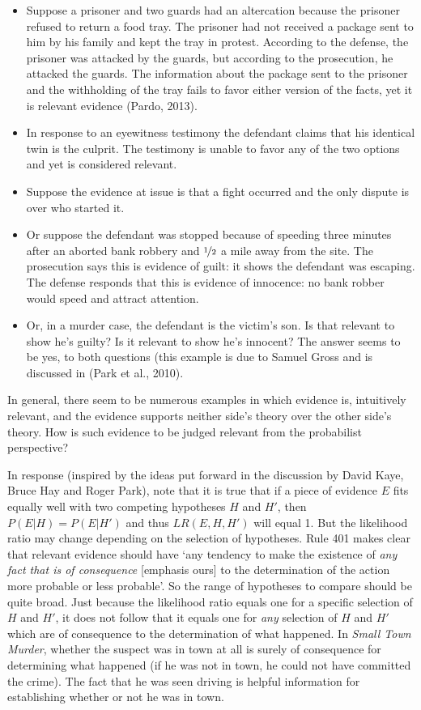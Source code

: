 \documentclass[10pt,dvipsnames,enabledeprecatedfontcommands]{scrartcl}
\begin{document}
\begin{itemize}
\item
  Suppose a prisoner and two guards had an altercation because the
  prisoner refused to return a food tray. The prisoner had not received
  a package sent to him by his family and kept the tray in protest.
  According to the defense, the prisoner was attacked by the guards, but
  according to the prosecution, he attacked the guards. The information
  about the package sent to the prisoner and the withholding of the tray
  fails to favor either version of the facts, yet it is relevant
  evidence (Pardo, 2013).
\item
  In response to an eyewitness testimony the defendant claims that his
  identical twin is the culprit. The testimony is unable to favor any of
  the two options and yet is considered relevant.
\item
  Suppose the evidence at issue is that a fight occurred and the only
  dispute is over who started it.
\item
  Or suppose the defendant was stopped because of speeding three minutes
  after an aborted bank robbery and \(\nicefrac{1}{2}\) a mile away from
  the site. The prosecution says this is evidence of guilt: it shows the
  defendant was escaping. The defense responds that this is evidence of
  innocence: no bank robber would speed and attract attention.
\item
  Or, in a murder case, the defendant is the victim's son. Is that
  relevant to show he's guilty? Is it relevant to show he's innocent?
  The answer seems to be yes, to both questions (this example is due to
  Samuel Gross and is discussed in (Park et al., 2010).
\end{itemize}

In general, there seem to be numerous examples in which evidence is,
intuitively relevant, and the evidence supports neither side's theory
over the other side's theory. How is such evidence to be judged relevant
from the probabilist perspective?

In response (inspired by the ideas put forward in the discussion by
David Kaye, Bruce Hay and Roger Park), note that it is true that if a
piece of evidence \(E\) fits equally well with two competing hypotheses
\(H\) and \(H'\), then \(P(E\vert H)=P(E\vert H')\) and thus
\(LR(E,H,H')\) will equal 1. But the likelihood ratio may change
depending on the selection of hypotheses. Rule 401 makes clear that
relevant evidence should have `any tendency to make the existence of
\emph{any fact that is of consequence} {[}emphasis ours{]} to the
determination of the action more probable or less probable'. So the
range of hypotheses to compare should be quite broad. Just because the
likelihood ratio equals one for a specific selection of \(H\) and
\(H'\), it does not follow that it equals one for \textit{any} selection
of \(H\) and \(H'\) which are of consequence to the determination of
what happened. In \textit{Small Town Murder}, whether the suspect was in
town at all is surely of consequence for determining what happened (if
he was not in town, he could not have committed the crime). The fact
that he was seen driving is helpful information for establishing whether
or not he was in town.
\end{document}
